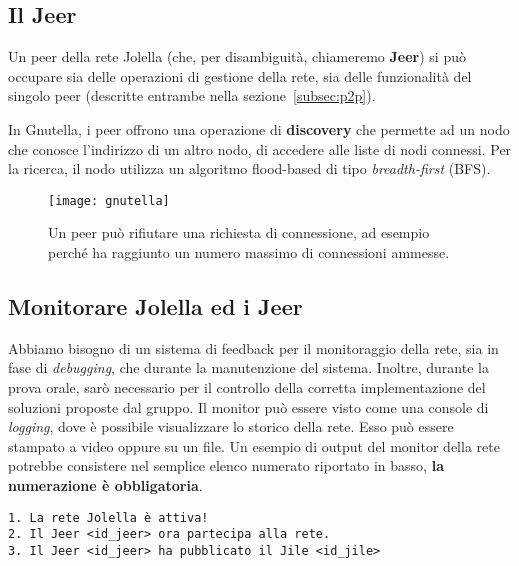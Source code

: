 \subsection{Il Jeer}
\label{subsec:jeer}

Un peer della rete Jolella (che, per disambiguità, chiameremo \textbf{Jeer}) si
può occupare sia delle operazioni di gestione della rete, sia delle funzionalità
del singolo peer (descritte entrambe nella sezione~\ref{subsec:p2p}).

In Gnutella, i peer offrono una operazione di \textbf{discovery} che permette ad
un nodo che conosce l'indirizzo di un altro nodo, di accedere alle liste di nodi
connessi. Per la ricerca, il  nodo utilizza un algoritmo flood-based di tipo
\textit{breadth-first} (BFS).

\begin{figure}[H]
 \centering
 \texttt{[image: gnutella]}
 \caption{Un peer può rifiutare una richiesta di connessione, ad esempio perché ha raggiunto un numero massimo di connessioni ammesse.}
\end{figure}

\subsection{Monitorare Jolella ed i Jeer}

Abbiamo bisogno di un sistema di feedback per il monitoraggio della rete, sia in
fase di \textit{debugging}, che durante la manutenzione del sistema. Inoltre,
durante la prova orale, sarò necessario per il controllo della corretta
implementazione del soluzioni proposte dal gruppo. Il monitor può essere visto
come una console di \textit{logging}, dove è possibile visualizzare lo storico
della rete. Esso può essere stampato a video oppure su un file. Un esempio di
output del monitor della rete potrebbe consistere nel semplice elenco numerato
riportato in basso, \textbf{la numerazione è obbligatoria}.

\begin{verbatim}
1. La rete Jolella è attiva!
2. Il Jeer <id_jeer> ora partecipa alla rete.
3. Il Jeer <id_jeer> ha pubblicato il Jile <id_jile>
\end{verbatim}
